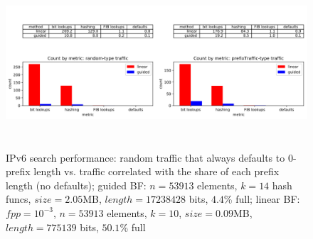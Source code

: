 \documentclass[conference,compsoc]{IEEEtran}
\begin{document}
\begin{figure}[p]
\centering
\includegraphics[height=2.5in]{../img/ipv6_traffic_comparison.png}
\caption{IPv6 search performance: random traffic that always defaults to 0-prefix length vs. traffic correlated with the share of each prefix length (no defaults);
  guided BF: $n=53913$ elements, $k=14$ hash funcs, $size=2.05$MB, $length=17238428$ bits, $4.4$\% full;
  linear BF: $fpp=10^{-3}$, $n=53913$ elements, $k=10$, $size=0.09$MB, $length=775139$ bits, $50.1$\% full}
\label{fig:IPv6-by-traffic}
\end{figure}
\clearpage
\end{document}
